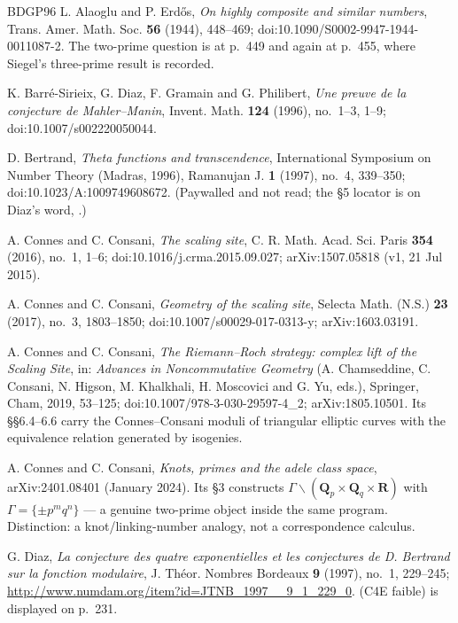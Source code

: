 \documentclass[11pt]{article}
\theoremstyle{definition}
\theoremstyle{remark}
\newcommand{\Q}{\mathbf{Q}}
\newcommand{\R}{\mathbf{R}}
\begin{document}
\begin{thebibliography}{BDGP96}
 L. Alaoglu and P. Erd\H{o}s, \emph{On highly composite
and similar numbers}, Trans. Amer. Math. Soc. \textbf{56} (1944), 448--469;
doi:10.1090/S0002-9947-1944-0011087-2. The two-prime question is at p.~449 and
again at p.~455, where Siegel's three-prime result is recorded.

 K. Barr\'e-Sirieix, G. Diaz, F. Gramain and
G. Philibert, \emph{Une preuve de la conjecture de Mahler--Manin},
Invent. Math. \textbf{124} (1996), no.~1--3, 1--9; doi:10.1007/s002220050044.

 D. Bertrand, \emph{Theta functions and transcendence},
International Symposium on Number Theory (Madras, 1996), Ramanujan J.
\textbf{1} (1997), no.~4, 339--350; doi:10.1023/A:1009749608672.
(Paywalled and not read; the \S5 locator is on Diaz's word, \cite[p.~231 and
bibliography item 2]{Dia97}.)

 A. Connes and C. Consani, \emph{The scaling site},
C. R. Math. Acad. Sci. Paris \textbf{354} (2016), no.~1, 1--6;
doi:10.1016/j.crma.2015.09.027; arXiv:1507.05818 (v1, 21 Jul 2015).

 A. Connes and C. Consani, \emph{Geometry of the scaling
site}, Selecta Math. (N.S.) \textbf{23} (2017), no.~3, 1803--1850;
doi:10.1007/s00029-017-0313-y; arXiv:1603.03191.

 A. Connes and C. Consani, \emph{The Riemann--Roch
strategy: complex lift of the Scaling Site}, in: \emph{Advances in
Noncommutative Geometry} (A. Chamseddine, C. Consani, N. Higson, M. Khalkhali,
H. Moscovici and G. Yu, eds.), Springer, Cham, 2019, 53--125;
doi:10.1007/978-3-030-29597-4\_2; arXiv:1805.10501. Its \S\S6.4--6.6 carry the
Connes--Consani moduli of triangular elliptic curves with the equivalence
relation generated by isogenies.

 A. Connes and C. Consani, \emph{Knots, primes and the
adele class space}, arXiv:2401.08401 (January 2024). Its \S3 constructs
$\Gamma \backslash (\Q_p \times \Q_q \times \R)$ with
$\Gamma = \{\pm p^m q^n\}$ --- a genuine two-prime object inside the same
program. Distinction: a knot/linking-number analogy, not a
correspondence calculus.

 G. Diaz, \emph{La conjecture des quatre exponentielles
et les conjectures de D. Bertrand sur la fonction modulaire},
J. Th\'eor. Nombres Bordeaux \textbf{9} (1997), no.~1, 229--245;
\url{http://www.numdam.org/item?id=JTNB_1997__9_1_229_0}. (C4E faible) is
displayed on p.~231.


\end{thebibliography}
\end{document}
